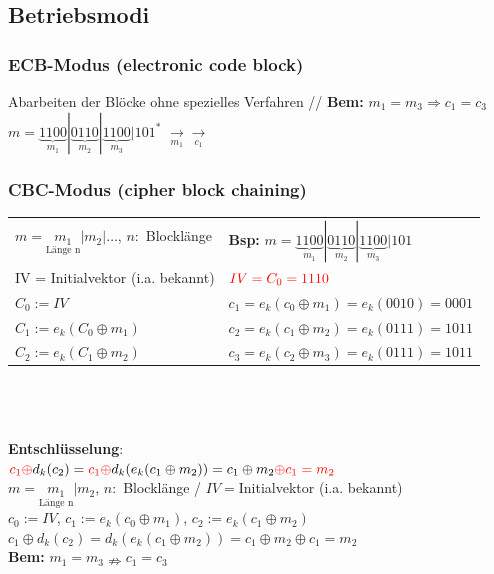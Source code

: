 \documentclass[10pt]{article}
\newcommand{\Bold}[1]{\textbf{#1}} %
\newcommand{\T}[1]{\text{#1}} %
\newcommand{\Ra}{\Rightarrow}
\newcommand{\Unten}[2]{\underset{#1}{#2}} %
\begin{document}
\subsection{Betriebsmodi}
\subsubsection{ECB-Modus (electronic code block)}
Abarbeiten der Blöcke ohne spezielles Verfahren {\color{gray} // \Bold{Bem:} $m_1=m_3\Ra c_1=c_3$} \\
 $m=\underbrace{1100}_{m_1}|\underbrace{0110}_{m_2}|\underbrace{1100}_{m_3}|101^*$ $\Unten{m_1}{\longrightarrow}$$\Unten{c_1}{\longrightarrow}$ 
\subsubsection{CBC-Modus (cipher block chaining)}
\begin{tabular}{p{7.5cm}  l}
	$m=\Unten{\T{Länge n}}{m_1}|m_2|\dots$, $n:$ Blocklänge &\Bold{Bsp:} $m=\underbrace{1100}_{m_1} | \underbrace{0110}_{m_2} | \underbrace{1100}_{m_3} | 101$ \\
	{\color{red}IV = Initialvektor} (i.a. bekannt) &  $\color{red}IV=C_0=1110$  \\
	$C_0 := IV$ & $c_1 = e_k(c_0 \oplus m_1) = e_k(0010) = 0001$ \\
	$C_1 := e_k(C_0 \oplus m_1)$ & $c_2 = e_k(c_1 \oplus m_2) = e_k(0111) = 1011$ \\
	$C_2 := e_k(C_1 \oplus m_2)$  & $c_3 = e_k(c_2 \oplus m_3) = e_k(0111) = 1011$ \\
\end{tabular} \\ \\ \\
 \textbf{Entschlüsselung}:  \\
 ${\color{red}c_1\oplus} d_k(c_2)={\color{red}c_1\oplus}d_k(e_k(c_1\oplus m_2))= c_1\oplus m_2 {\color{red}\oplus c_1 = m_2}$ \\
 $m=\Unten{\T{Länge n}}{m_1}|m_2$, $n:$ Blocklänge / $IV=$Initialvektor (i.a. bekannt)\\
 $c_0:=IV$, $c_1:=e_k(c_0\oplus m_1)$, $c_2:=e_k(c_1\oplus m_2)$\\
 $c_1\oplus d_k(c_2)=d_k(e_k(c_1\oplus m_2))=c_1\oplus m_2\oplus c_1=m_2$ \\
 \Bold{Bem:} $m_1=m_3\nRightarrow c_1=c_3$
 
\end{document}
